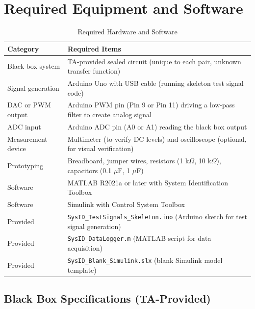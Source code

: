 \documentclass[11pt,letterpaper]{article}
\begin{document}
\section{Required Equipment and Software}

\begin{table}[H]
    \centering
    \caption{Required Hardware and Software}
    \label{tab:equipment}
    \begin{tabularx}{\linewidth}{l X}
    \toprule
    \textbf{Category} & \textbf{Required Items}\\
    \midrule
    Black box system & TA-provided sealed circuit (unique to each pair, unknown transfer function)\\
    Signal generation & Arduino Uno with USB cable (running skeleton test signal code)\\
    DAC or PWM output & Arduino PWM pin (Pin 9 or Pin 11) driving a low-pass filter to create analog signal\\
    ADC input & Arduino ADC pin (A0 or A1) reading the black box output\\
    Measurement device & Multimeter (to verify DC levels) and oscilloscope (optional, for visual verification)\\
    Prototyping & Breadboard, jumper wires, resistors (1 k$\Omega$, 10 k$\Omega$), capacitors (0.1 $\mu$F, 1 $\mu$F)\\
    Software & MATLAB R2021a or later with System Identification Toolbox\\
    Software & Simulink with Control System Toolbox\\
    Provided & \texttt{SysID\_TestSignals\_Skeleton.ino} (Arduino sketch for test signal generation)\\
    Provided & \texttt{SysID\_DataLogger.m} (MATLAB script for data acquisition)\\
    Provided & \texttt{SysID\_Blank\_Simulink.slx} (blank Simulink model template)\\
    \bottomrule
    \end{tabularx}
\end{table}

\subsection*{Black Box Specifications (TA-Provided)}
\end{document}
